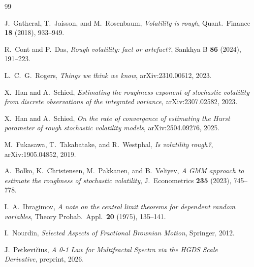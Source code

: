 \documentclass[11pt,a4paper]{article}
\theoremstyle{definition}
\theoremstyle{remark}
\begin{document}
\begin{thebibliography}{99}

J.~Gatheral, T.~Jaisson, and M.~Rosenbaum,
\textit{Volatility is rough},
Quant.\ Finance \textbf{18} (2018), 933--949.

R.~Cont and P.~Das,
\textit{Rough volatility: fact or artefact?},
Sankhya B \textbf{86} (2024), 191--223.

L.~C.~G.~Rogers,
\textit{Things we think we know},
arXiv:2310.00612, 2023.

X.~Han and A.~Schied,
\textit{Estimating the roughness exponent of stochastic volatility
from discrete observations of the integrated variance},
arXiv:2307.02582, 2023.

X.~Han and A.~Schied,
\textit{On the rate of convergence of estimating the Hurst parameter
of rough stochastic volatility models},
arXiv:2504.09276, 2025.

M.~Fukasawa, T.~Takabatake, and R.~Westphal,
\textit{Is volatility rough?},
arXiv:1905.04852, 2019.

A.~Bolko, K.~Christensen, M.~Pakkanen, and B.~Veliyev,
\textit{A GMM approach to estimate the roughness of stochastic
volatility},
J.\ Econometrics \textbf{235} (2023), 745--778.

I.~A.~Ibragimov,
\textit{A note on the central limit theorems for dependent random
variables},
Theory Probab.\ Appl.\ \textbf{20} (1975), 135--141.

I.~Nourdin,
\textit{Selected Aspects of Fractional Brownian Motion},
Springer, 2012.

J.~Petkevi\v{c}ius,
\textit{A 0-1 Law for Multifractal Spectra via the HGDS Scale
Derivative},
preprint, 2026.

\end{thebibliography}
\end{document}
